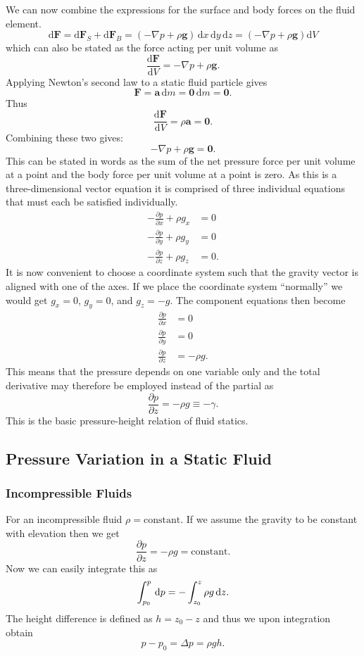 We can now combine the expressions for the surface and body forces on the fluid element.
\[ 
\mathrm{d}\textbf{F} = \mathrm{d}\textbf{F}_S + \mathrm{d}\textbf{F}_B = \left( - \nabla p + \rho \textbf{g} \right) \, \mathrm{d}x \, \mathrm{d}y \, \mathrm{d}z = \left( - \nabla p + \rho \textbf{g} \right) \mathrm{d}V
\]
which can also be stated as the force acting per unit volume as
\[ 
\frac{\mathrm{d}\textbf{F}}{\mathrm{d}V} = - \nabla p + \rho \textbf{g} 
.\]
Applying Newton's second law to a static fluid particle gives
\[ 
\textbf{F} = \textbf{a} \, \mathrm{d}m = \textbf{0} \, \mathrm{d}m = \textbf{0}
.\]
Thus
\[ 
\frac{\mathrm{d}\textbf{F}}{\mathrm{d}V} = \rho \textbf{a} = \textbf{0} 
.\]
Combining these two gives:
\[ 
- \nabla  p + \rho \textbf{g} = \textbf{0}
.\]
This can be stated in words as the sum of the net pressure force per unit volume at a point and the body force per unit volume at a point is zero. As this is a three-dimensional vector equation it is comprised of three individual equations that must each be satisfied individually.
\begin{align*}
  - \frac{\partial p}{\partial x} + \rho g_x &= 0 \\
  - \frac{\partial p}{\partial y} + \rho g_y &= 0 \\
  - \frac{\partial p}{\partial z} + \rho g_z &= 0
.\end{align*}
It is now convenient to choose a coordinate system such that the gravity vector is aligned with one of the axes. If we place the coordinate system ``normally'' we would get $g_x = 0$, $g_y = 0$, and $g_z = -g$. The component equations then become
\begin{align*}
  \frac{\partial p}{\partial x} &= 0 \\
  \frac{\partial p}{\partial y} &= 0 \\
  \frac{\partial p}{\partial z} &= -\rho g
.\end{align*}
This means that the pressure depends on one variable only and the total derivative may therefore be employed instead of the partial as
\[ 
\frac{\partial p}{\partial z} = - \rho g \equiv -\gamma
.\]
This is the basic pressure-height relation of fluid statics. 

\subsection{Pressure Variation in a Static Fluid}

\subsubsection{Incompressible Fluids}
For an incompressible fluid $\rho = \text{constant}$. If we assume the gravity to be constant with elevation then we get
\[ 
\frac{\partial p}{\partial z} = - \rho g = \text{constant}
.\]
Now we can easily integrate this as
\[
  \int_{p_0}^{p} \, \mathrm{d}p = - \int_{z_0}^{z} \rho g \, \mathrm{d}z \\
.\]
The height difference is defined as $h = z_0 - z$ and thus we upon integration obtain
\[ 
p - p_0 = \Delta p = \rho gh
.\]

